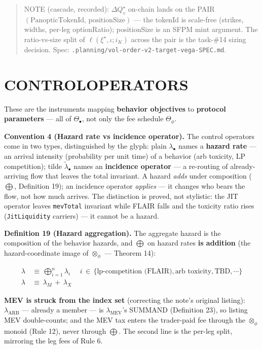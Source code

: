 \documentclass[11pt]{article}
\renewcommand{\_}{\textunderscore\allowbreak}
\begin{document}
\begin{quote}
NOTE (cascade, recorded): \(\Delta Q_v^{\star}\) on-chain lands on the PAIR \((\text{PanopticTokenId},\, \text{positionSize})\) --- the tokenId is scale-free (strikes, widths, per-leg optionRatio); positionSize is an SFPM mint argument. The ratio-vs-size split of \(\ell(\xi^{\star},\iota;i_K)\) across the pair is the task-\#14 sizing decision. Spec: \texttt{.planning/vol-order-v2-target-vega-SPEC.md}.
\end{quote}

\section*{CONTROL\_OPERATORS}\label{control_operators}

These are the instruments mapping \textbf{behavior objectives} to \textbf{protocol parameters} --- all of \(\Theta_{\bullet}\), not only the fee schedule \(\Theta_{\phi}\).

\textbf{Convention 4 (Hazard rate vs incidence operator).} The control operators come in two types, distinguished by the glyph: plain \(\lambda_{\bullet}\) names a \textbf{hazard rate} --- an arrival intensity (probability per unit time) of a behavior (arb toxicity, LP competition); tilde \(\tilde\lambda_{\bullet}\) names an \textbf{incidence operator} --- a re-routing of already-arriving flow that leaves the total invariant. A hazard \emph{adds} under composition (\(\bigoplus\), Definition 19); an incidence operator \emph{applies} --- it changes who bears the flow, not how much arrives. The distinction is proved, not stylistic: the JIT operator leaves \texttt{mevTotal} invariant while FLAIR falls and the toxicity ratio rises (\texttt{JitLiquidity} carriers) --- it cannot be a hazard.

\textbf{Definition 19 (Hazard aggregation).} The aggregate hazard is the composition of the behavior hazards, and \(\bigoplus\) on hazard rates \textbf{is addition} (the hazard-coordinate image of \(\otimes_{\phi}\) --- Theorem 14):

\[
    \begin{aligned}
        \lambda\, &\equiv \, \displaystyle \bigoplus_{i=1}^n \lambda_i \, \quad \, i \, \in \, \{\text{lp-competition (FLAIR)}, \text{arb toxicity}, \text{TBD}, \cdots \} \\
        \lambda \, &\equiv \, \lambda_M \, + \, \lambda_X
    \end{aligned}
\]

\textbf{MEV is struck from the index set} (correcting the note's original listing): \(\lambda_{\text{ARB}}\) --- already a member --- is \(\lambda_{\text{MEV}}\)'s SUMMAND (Definition 23), so listing MEV double-counts; and the MEV tax enters the trader-paid fee through the \(\otimes_{\phi}\) monoid (Rule 12), never through \(\bigoplus\). The second line is the per-leg split, mirroring the leg fees of Rule 6.
\end{document}
